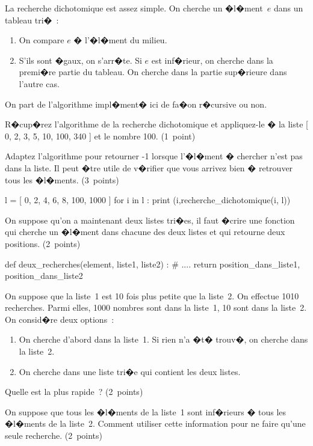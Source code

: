 \exosubject{}
\begin{xexercice}\label{td_note_label4_2014}%

La recherche dichotomique est assez simple. On cherche un �l�ment~$e$ dans un tableau tri�~:

\begin{enumerate}
\item On compare $e$ � l'�l�ment du milieu.
\item S'ils sont �gaux, on s'arr�te. Si $e$ est inf�rieur, on cherche dans la premi�re partie du tableau. On cherche dans la partie sup�rieure dans l'autre cas.
\end{enumerate}

On part de l'algorithme impl�ment� ici de fa�on r�cursive ou non.


\exequest R�cup�rez l'algorithme de la recherche dichotomique et appliquez-le � la liste [ 0, 2, 3, 5, 10, 100, 340 ] et le nombre 100. (1~point)

\exequest Adaptez l'algorithme pour retourner -1 lorsque l'�l�ment � chercher n'est pas dans la liste. Il peut �tre utile de v�rifier que vous arrivez bien � retrouver tous les �l�ments. (3~points)  

\begin{verbatimx}
l = [ 0, 2, 4, 6, 8, 100, 1000 ]
for i in l :
    print (i,recherche_dichotomique(i, l)) 
\end{verbatimx}

\exequest On suppose qu'on a maintenant deux listes tri�es, il faut �crire une fonction qui cherche un �l�ment dans chacune des deux listes et qui retourne deux positions. (2~points)

\begin{verbatimx}
def deux_recherches(element, liste1, liste2) :
    # ....
    return position_dans_liste1, position_dans_liste2
\end{verbatimx}

\exequest On suppose que la liste~1 est 10 fois plus petite que la liste~2. On effectue 1010 recherches. Parmi elles, 1000 nombres sont dans la liste~1, 10 sont dans la liste~2. On consid�re deux options~:
\begin{enumerate}
\item On cherche d'abord dans la liste~1. Si rien n'a �t� trouv�, on cherche dans la liste~2.
\item On cherche dans une liste tri�e qui contient les deux listes.
\end{enumerate}

Quelle est la plus rapide~? (2~points)

\exequest On suppose que tous les �l�ments de la liste~1 sont inf�rieurs � tous les �l�ments de la liste~2. Comment utiliser cette information pour ne faire qu'une seule recherche. (2~points)



\end{xexercice}




